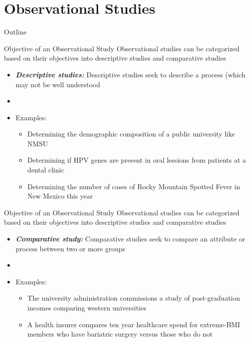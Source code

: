 \documentclass[xcolor=dvipsnames]{beamer}
\begin{document}
\section{Observational Studies}
\begin{frame}{Outline}
\tableofcontents[currentsection,subsectionstyle=show/shaded/hide]
\end{frame}

\begin{frame}{Objective of an Observational Study}
Observational studies can be categorized based on their objectives into descriptive studies and comparative studies
		\begin{itemize}
			\item \textbf{\emph{Descriptive studies:}} Descriptive studies seek to describe a process (which may not be well understood
			\item[]
			\item Examples:
			\begin{itemize}
				\item Determining the demographic composition of a public university like NMSU
				\item Determining if HPV genes are present in oral lessions from patients at a dental clinic
				\item Determining the number of cases of Rocky Mountain Spotted Fever in New Mexico this year
			\end{itemize}			
		\end{itemize}
\end{frame}

\begin{frame}{Objective of an Observational Study}
Observational studies can be categorized based on their objectives into descriptive studies and comparative studies
\begin{itemize}
\item \textbf{\emph{Comparative study:}} Comparative studies seek to compare an attribute or process between two or more groups
\item[]
\item Examples:
\begin{itemize}
	\item The university administration commissions a study of post-graduation incomes comparing western universities
	\item A health insurer compares ten year healthcare spend for extreme-BMI members who have bariatric surgery versus those who do not
\end{itemize}
\end{itemize}
\end{frame}
\end{document}
